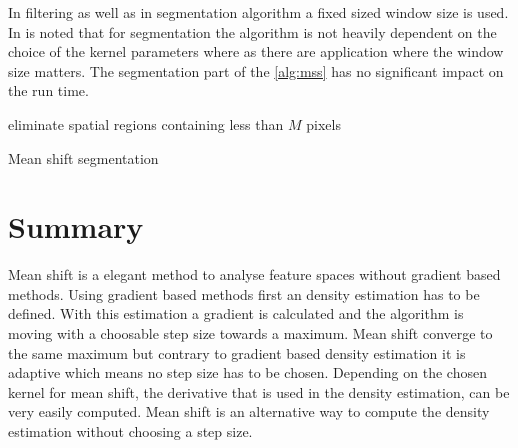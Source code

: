 In filtering as well as in segmentation algorithm a fixed sized window
size is used. In \citeauthor{citeulike:462300}
\citep{citeulike:462300} is noted that for segmentation the
algorithm is not heavily dependent on the choice of the kernel
parameters where as there are application where the window size
matters.  The segmentation part of the \autoref{alg:mss} has no
significant impact on the run time.


\newcommand{\mycapfn}[1]{\color{black} #1}

\begin{algorithm2e}[H]
	\DontPrintSemicolon
	\BlankLine
	

	\BlankLine
	
	\BlankLine
	\BlankLine
	
	\BlankLine
	eliminate spatial regions containing less than $M$ pixels\;
	\BlankLine
	
	\caption{Mean shift segmentation}
	\label{alg:mss}
\end{algorithm2e}

\section{Summary} %
\label{sec:summary}

Mean shift is a elegant method to analyse feature spaces without gradient based
methods. Using gradient based methods first an density estimation has to be defined.
With this estimation a gradient is calculated and the algorithm is moving with
a choosable step size towards a maximum. Mean shift converge to the same maximum 
but contrary to gradient based density estimation it is adaptive which means 
no step size has to be chosen. Depending on the chosen kernel for mean shift,
the derivative that is used in the density estimation, can be very easily 
computed. Mean shift is an alternative way to compute the density estimation
without choosing a step size. 



